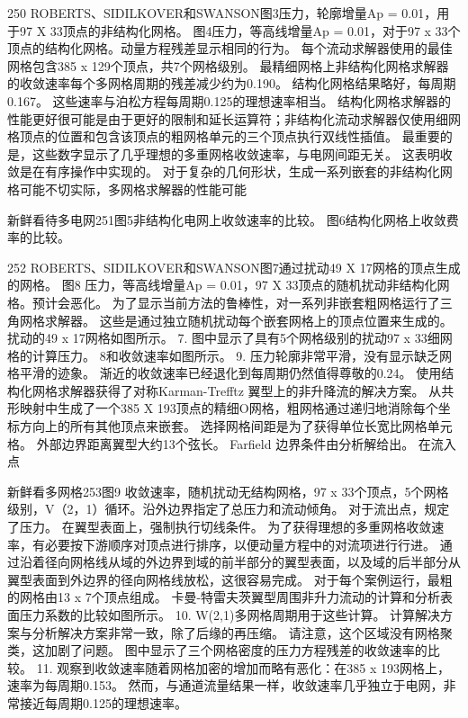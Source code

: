 \documentclass[UTF8,11pt,a4paper,openany,fontset=fandol]{ctexbook}
\begin{document}
250 ROBERTS、SIDILKOVER和SWANSON图3压力，轮廓增量Ap = 0.01，用于97 X 33顶点的非结构化网格。 图4压力，等高线增量Ap = 0.01，对于97 x 33个顶点的结构化网格。动量方程残差显示相同的行为。 每个流动求解器使用的最佳网格包含385 x 129个顶点，共7个网格级别。 最精细网格上非结构化网格求解器的收敛速率每个多网格周期的残差减少约为0.190。 结构化网格结果略好，每周期0.167。 这些速率与泊松方程每周期0.125的理想速率相当。 结构化网格求解器的性能更好很可能是由于更好的限制和延长运算符；非结构化流动求解器仅使用细网格顶点的位置和包含该顶点的粗网格单元的三个顶点执行双线性插值。 最重要的是，这些数字显示了几乎理想的多重网格收敛速率，与电网间距无关。 这表明收敛是在有序操作中实现的。 对于复杂的几何形状，生成一系列嵌套的非结构化网格可能不切实际，多网格求解器的性能可能

新鲜看待多电网251图5非结构化电网上收敛速率的比较。 图6结构化网格上收敛费率的比较。

252 ROBERTS、SIDILKOVER和SWANSON图7通过扰动49 X 17网格的顶点生成的网格。 图8 压力，等高线增量Ap = 0.01，97 X 33顶点的随机扰动非结构化网格。预计会恶化。 为了显示当前方法的鲁棒性，对一系列非嵌套粗网格运行了三角网格求解器。 这些是通过独立随机扰动每个嵌套网格上的顶点位置来生成的。 扰动的49 x 17网格如图所示。 7. 图中显示了具有5个网格级别的扰动97 x 33细网格的计算压力。 8和收敛速率如图所示。 9. 压力轮廓非常平滑，没有显示缺乏网格平滑的迹象。 渐近的收敛速率已经退化到每周期仍然值得尊敬的0.24。 使用结构化网格求解器获得了对称Karman-Trefftz 翼型上的非升降流的解决方案。 从共形映射中生成了一个385 X 193顶点的精细O网格，粗网格通过递归地消除每个坐标方向上的所有其他顶点来嵌套。 选择网格间距是为了获得单位长宽比网格单元格。 外部边界距离翼型大约13个弦长。 Farfield 边界条件由分析解给出。 在流入点

新鲜看多网格253图9 收敛速率，随机扰动无结构网格，97 x 33个顶点，5个网格级别，V（2，1）循环。沿外边界指定了总压力和流动倾角。 对于流出点，规定了压力。 在翼型表面上，强制执行切线条件。 为了获得理想的多重网格收敛速率，有必要按下游顺序对顶点进行排序，以便动量方程中的对流项进行行进。 通过沿着径向网格线从域的外边界到域的前半部分的翼型表面，以及域的后半部分从翼型表面到外边界的径向网格线放松，这很容易完成。 对于每个案例运行，最粗的网格由13 x 7个顶点组成。 卡曼-特雷夫茨翼型周围非升力流动的计算和分析表面压力系数的比较如图所示。 10. W(2,1)多网格周期用于这些计算。 计算解决方案与分析解决方案非常一致，除了后缘的再压缩。 请注意，这个区域没有网格聚类，这加剧了问题。 图中显示了三个网格密度的压力方程残差的收敛速率的比较。 11. 观察到收敛速率随着网格加密的增加而略有恶化：在385 x 193网格上，速率为每周期0.153。 然而，与通道流量结果一样，收敛速率几乎独立于电网，非常接近每周期0.125的理想速率。
\end{document}
